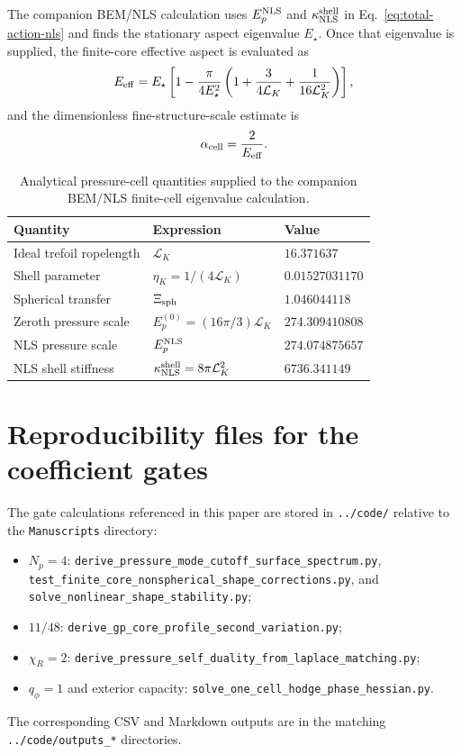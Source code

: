 \documentclass[11pt]{article}
\newcommand{\EpNLS}{E_p^{\rm NLS}}
\newcommand{\kappaNLS}{\kappa_{\rm NLS}^{\rm shell}}
\begin{document}
The companion BEM/NLS calculation uses \(\EpNLS\) and \(\kappaNLS\) in
Eq.~\eqref{eq:total-action-nls} and finds the stationary aspect eigenvalue \(E_\star\).  Once
that eigenvalue is supplied, the finite-core effective aspect is evaluated as
\begin{equation}
  E_{\rm eff}
  =
  E_\star
  \left[
  1-
  \frac{\pi}{4E_\star^2}
  \left(
  1+\frac{3}{4\mathcal L_K}+\frac{1}{16\mathcal L_K^2}
  \right)
  \right],
  \label{eq:Eeff-star}
\end{equation}
and the dimensionless fine-structure-scale estimate is
\begin{equation}
  \alpha_{\rm cell}=\frac{2}{E_{\rm eff}}.
  \label{eq:alpha-star}
\end{equation}

\begin{table}[h]
\centering
\caption{Analytical pressure-cell quantities supplied to the companion BEM/NLS finite-cell eigenvalue calculation.}
\begin{tabular}{@{}lll@{}}
\toprule
Quantity & Expression & Value \\
\midrule
Ideal trefoil ropelength & \(\mathcal L_K\) & \(16.371637\) \\
Shell parameter & \(\eta_K=1/(4\mathcal L_K)\) & \(0.01527031170\) \\
Spherical transfer & \(\Xi_{\rm sph}\) & \(1.046044118\) \\
Zeroth pressure scale & \(E_p^{(0)}=(16\pi/3)\mathcal L_K\) & \(274.309410808\) \\
NLS pressure scale & \(\EpNLS\) & \(274.074875657\) \\
NLS shell stiffness & \(\kappaNLS=8\pi\mathcal L_K^2\) & \(6736.341149\) \\
\bottomrule
\end{tabular}
\label{tab:nls-pressure}
\end{table}


\section{Reproducibility files for the coefficient gates}
\label{sec:gate-reproducibility-files}

The gate calculations referenced in this paper are stored in \texttt{../code/}
relative to the \texttt{Manuscripts} directory:
\begin{itemize}
\item \(N_p=4\): \texttt{derive\_pressure\_mode\_cutoff\_surface\_spectrum.py},
\texttt{test\_finite\_core\_nonspherical\_shape\_corrections.py}, and
\texttt{solve\_nonlinear\_shape\_stability.py};
\item \(11/48\): \texttt{derive\_gp\_core\_profile\_second\_variation.py};
\item \(\chi_R=2\): \texttt{derive\_pressure\_self\_duality\_from\_laplace\_matching.py};
\item \(q_\phi=1\) and exterior capacity:
\texttt{solve\_one\_cell\_hodge\_phase\_hessian.py}.
\end{itemize}
The corresponding CSV and Markdown outputs are in the matching
\texttt{../code/outputs\_*} directories.
\end{document}

